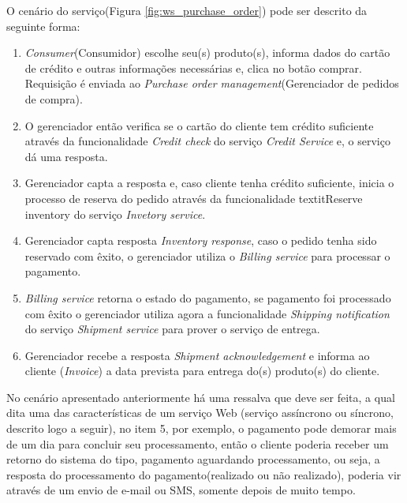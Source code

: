 O cenário do serviço(Figura \ref{fig:ws_purchase_order}) pode ser descrito da seguinte forma:
\begin{enumerate}
\item \textit{Consumer}(Consumidor) escolhe seu(s) produto(s), informa dados do cartão de crédito e outras informações necessárias e, clica no botão comprar. Requisição é enviada ao \textit{Purchase order management}(Gerenciador de pedidos de compra).
\item O gerenciador então verifica se o cartão do cliente tem crédito suficiente através da funcionalidade \textit{Credit check} do serviço \textit{Credit Service} e, o serviço dá uma resposta.
\item Gerenciador capta a resposta e, caso cliente tenha crédito suficiente, inicia o processo de reserva do pedido através da funcionalidade textit{Reserve inventory} do serviço \textit{Invetory service}.
\item Gerenciador capta resposta \textit{Inventory response}, caso o pedido tenha sido reservado com êxito, o gerenciador utiliza o \textit{Billing service} para processar o pagamento.
\item \textit{Billing service} retorna o estado do pagamento, se pagamento foi processado com êxito o gerenciador utiliza agora a funcionalidade \textit{Shipping notification} do serviço \textit{Shipment service} para prover o serviço de entrega.
\item Gerenciador recebe a resposta \textit{Shipment acknowledgement} e informa ao cliente (\textit{Invoice}) a data prevista para entrega do(s) produto(s) do cliente.
\end{enumerate}

No cenário apresentado anteriormente há uma ressalva que deve ser feita, a qual dita uma das características de um serviço Web (serviço assíncrono ou síncrono, descrito logo a seguir), no item 5, por exemplo, o pagamento pode demorar mais de um dia para concluir seu processamento, então o cliente poderia receber um retorno do sistema do tipo, pagamento aguardando processamento, ou seja, a resposta do processamento do pagamento(realizado ou não realizado), poderia vir através de um envio de e-mail ou SMS, somente depois de muito tempo.

